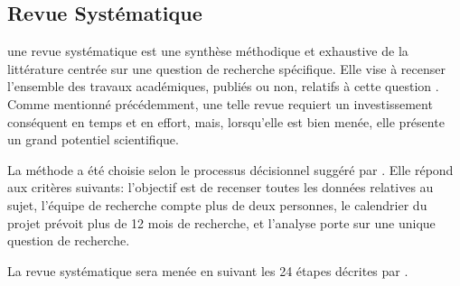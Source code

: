 \documentclass[
  letterpaper,
]{scrbook}
\begin{document}
\hypertarget{revue-systuxe9matique}{%
\subsection{Revue Systématique}\label{revue-systuxe9matique}}

une revue systématique est une synthèse méthodique et exhaustive de la
littérature centrée sur une question de recherche spécifique. Elle vise
à recenser l'ensemble des travaux académiques, publiés ou non, relatifs
à cette question \parencite{kibbee23}. Comme mentionné précédemment, une
telle revue requiert un investissement conséquent en temps et en effort,
mais, lorsqu'elle est bien menée, elle présente un grand potentiel
scientifique.

La méthode a été choisie selon le processus décisionnel suggéré par
\textcite[16]{cloutier23}. Elle répond aux critères suivants: l'objectif
est de recenser toutes les données relatives au sujet, l'équipe de
recherche compte plus de deux personnes, le calendrier du projet prévoit
plus de 12 mois de recherche, et l'analyse porte sur une unique question
de recherche.

La revue systématique sera menée en suivant les 24 étapes décrites par
\textcite{muka_etal20}.
\end{document}
